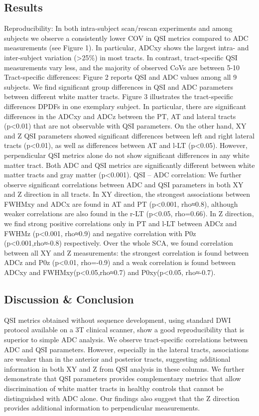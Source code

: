 \subsection*{Results}
Reproducibility: In both intra-subject scan/rescan experiments and among subjects we observe a consistently lower COV in QSI metrics compared to ADC measurements (see Figure 1). In particular, ADCxy shows the largest intra- and inter-subject variation (>25\%) in most tracts. In contrast, tract-specific QSI measurements vary less, and the majority of observed CoVs are between 5-10%
Tract-specific differences: Figure 2 reports QSI and ADC values among all 9 subjects. We find significant group differences in QSI and ADC parameters between different white matter tracts. Figure 3 illustrates the tract-specific differences DPDFs in one exemplary subject. In particular, there are significant differences in the ADCxy and ADCz between the PT, AT and lateral tracts (p<0.01) that are not observable with QSI parameters. On the other hand, XY and Z QSI parameters showed significant differences between left and right lateral tracts (p<0.01), as well as differences between AT and l-LT (p<0.05). However, perpendicular QSI metrics alone do not show significant differences in any white matter tract. Both ADC and QSI metrics are significantly different between white matter tracts and gray matter (p<0.001).
QSI – ADC correlation: We further observe significant correlations between ADC and QSI parameters in both XY and Z direction in all tracts.  In XY direction, the strongest associations between FWHMxy and ADCx are found in AT and PT (p<0.001, rho≈0.8), although weaker correlations are also found in the r-LT (p<0.05, rho=0.66). In Z direction, we find strong positive correlations only in PT and l-LT between ADCz and FWHMz (p<0.001, rho≈0.9) and negative correlation with P0z (p<0.001,rho≈-0.8) respectively. Over the whole SCA, we found correlation between all XY and Z measurements: the strongest correlation is found between ADCz and P0z (p<0.01, rho=-0.9) and a weak correlation is found between ADCxy and FWHMxy(p<0.05,rho≈0.7) and P0xy(p<0.05, rho≈-0.7).
\subsection*{Discussion \& Conclusion}
QSI metrics obtained without sequence development, using standard DWI protocol available on a 3T clinical scanner, show a good reproducibility that is superior to simple ADC analysis.  We observe tract-specific correlations between ADC and QSI parameters. However, especially in the lateral tracts, associations are weaker than in the anterior and posterior tracts, suggesting additional information in both XY and Z from QSI analysis in these columns. We further demonstrate that QSI parameters provides complementary metrics that allow discrimination of white matter tracts in healthy controls that cannot be distinguished with ADC alone. Our findings also suggest that the Z direction provides additional information to perpendicular measurements.


